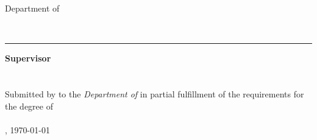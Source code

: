 \begin{titlepage}
    \begin{center}
        {\Large%
           \textsc{\university{}}%
        }
        \\\medskip
        {%
            \textbf{
                \universityFaculty{}
            }\\
            Department of \universityDepartment{}%
        }
        \\\vfill
        {\Huge%
            \textsc{%
                \documentTitle{}%
            }\par%
        }
        \medskip
        {\large%
            \textsl{%
                \documentSubtitle{}%
            }
        }
        \\\vfill
        {\Large%
            \textbf{\shortTitle{}}%
        }
    \end{center}
	\vfill
	\rule{\textwidth}{.4pt}
	\vfill
    \begin{flushleft}
        \textbf{Supervisor}\\
        \medskip
        \researchAdvisor{}\\
        \secondReader{}\\
        \bigskip
        Submitted by \textbf{\documentAuthor{}} to the \textsl{Department of \universityDepartment{}} in partial fulfillment of the requirements for the degree of\\
        \textbf{\academicDegree{}}\\
        \medskip{}
        \documentPlace{}, \germanDate{}\today{}\\
    \end{flushleft}
\end{titlepage}
